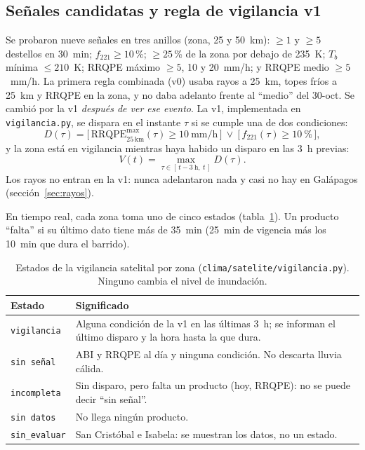 \documentclass{sosg-informe}
\begin{document}
\subsection{Señales candidatas y regla de vigilancia v1}
Se probaron nueve señales en tres anillos (zona, 25 y 50~km): $\geq 1$ y $\geq 5$ destellos en 30~min; $f_{221} \geq 10$\,\%; $\geq 25$\,\% de la zona por debajo de 235~K; $T_b$ mínima $\leq 210$~K; RRQPE máximo $\geq 5$, 10 y 20~mm/h; y RRQPE medio $\geq 5$~mm/h. La primera regla combinada (v0) usaba rayos a 25~km, topes fríos a 25~km y RRQPE en la zona, y no daba adelanto frente al \enquote{medio} del 30-oct. Se cambió por la v1 \emph{después de ver ese evento}. La v1, implementada en \texttt{vigilancia.py}, se dispara en el instante $\tau$ si se cumple una de dos condiciones:
\begin{equation}
  D(\tau) = \bigl[\,\mathrm{RRQPE}^{\max}_{25\,\text{km}}(\tau) \geq 10~\text{mm/h}\,\bigr] \ \lor\ \bigl[\,f_{221}(\tau) \geq 10~\text{\%}\,\bigr],
  \label{eq:v1}
\end{equation}
y la zona está en vigilancia mientras haya habido un disparo en las 3~h previas:
\begin{equation}
  V(t) = \max_{\tau \in [\,t-3~\text{h},\ t\,]} D(\tau).
  \label{eq:persistencia}
\end{equation}
Los rayos no entran en la v1: nunca adelantaron nada y casi no hay en Galápagos (sección~\ref{sec:rayos}).

En tiempo real, cada zona toma uno de cinco estados (tabla~\ref{tab:estados}). Un producto \enquote{falta} si su último dato tiene más de 35~min (25~min de vigencia más los 10~min que dura el barrido).

\begin{table}[ht]
  \centering\small
  \caption{Estados de la vigilancia satelital por zona (\texttt{clima/satelite/vigilancia.py}). Ninguno cambia el nivel de inundación.}
  \label{tab:estados}
  \begin{tabularx}{\linewidth}{l>{\raggedright\arraybackslash}X}
    \toprule
    Estado & Significado \\
    \midrule
    \texttt{vigilancia} & Alguna condición de la v1 en las últimas 3~h; se informan el último disparo y la hora hasta la que dura. \\
    \texttt{sin señal} & ABI y RRQPE al día y ninguna condición. No descarta lluvia cálida. \\
    \texttt{incompleta} & Sin disparo, pero falta un producto (hoy, RRQPE): no se puede decir \enquote{sin señal}. \\
    \texttt{sin datos} & No llega ningún producto. \\
    \texttt{sin\_evaluar} & San Cristóbal e Isabela: se muestran los datos, no un estado. \\
    \bottomrule
  \end{tabularx}
\end{table}
\end{document}
